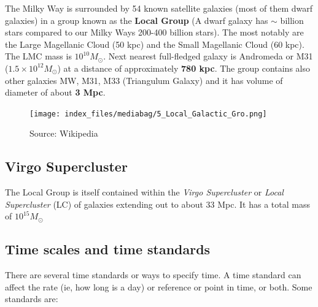 \documentclass[
  letterpaper,
  DIV=11,
  numbers=noendperiod]{scrreprt}
\begin{document}
The Milky Way is surrounded by 54 known satellite galaxies (most of them
dwarf galaxies) in a group known as the \textbf{Local Group} (A dwarf
galaxy has \(\sim\) billion stars compared to our Milky Ways 200-400
billion stars). The most notably are the Large Magellanic Cloud (50 kpc)
and the Small Magellanic Cloud (60 kpc). The LMC mass is
\(10^{10} M_{\odot}\). Next nearest full-fledged galaxy is Andromeda or
M31 (\(1.5\times 10^{12} M_{\odot}\)) at a distance of approximately
\textbf{780 kpc}. The group contains also other galaxies MW, M31, M33
(Triangulum Galaxy) and it has volume of diameter of about \textbf{3
Mpc}.

\begin{figure}[H]

{\centering \texttt{[image: index\_files/mediabag/5\_Local\_Galactic\_Gro.png]}

}

\caption{Source: Wikipedia}

\end{figure}%

\subsection*{Virgo Supercluster}\label{virgo-supercluster}

The Local Group is itself contained within the \emph{Virgo Supercluster}
or \emph{Local Supercluster} (LC) of galaxies extending out to about 33
Mpc. It has a total mass of \(10^{15}M_{\odot}\)

\subsection*{Time scales and time
standards}\label{time-scales-and-time-standards}

There are several time standards or ways to specify time. A time
standard can affect the rate (ie, how long is a day) or reference or
point in time, or both. Some standards are:
\end{document}
